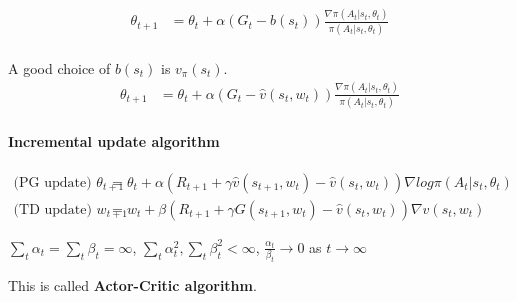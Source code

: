 \documentclass{article}
\begin{document}
\begin{align*}
  \theta_{t+1} &= \theta_t + \alpha (G_t - b(s_t))\frac{\nabla \pi(A_t|s_t, \theta_t)}{\pi(A_t|s_t, \theta_t)} \\
\end{align*}

A good choice of $b(s_t)$ is $v_{\pi}(s_t)$.
\begin{align*}
  \theta_{t+1} &= \theta_t + \alpha (G_t - \hat{v}(s_t, w_t))\frac{\nabla \pi(A_t|s_t, \theta_t)}{\pi(A_t|s_t, \theta_t)}
\end{align*}

\paragraph{Incremental update algorithm}
\begin{align*}
 \text{(PG update)  } \theta_{t+1} &= \theta_t + \alpha \left( R_{t+1} + \gamma \hat{v}(s_{t+1}, w_t) - \hat{v}(s_t, w_t) \right) \nabla log \pi(A_t|s_t, \theta_t) \\
  \text{(TD update) } w_{t+1} &= w_t + \beta\left(R_{t+1} + \gamma G(s_{t+1}, w_t) - \hat{v}(s_t, w_t)\right) \nabla \hat{v}(s_t, w_t)
\end{align*}

$\sum_t\alpha_t = \sum_t\beta_t = \infty$, $\sum_t\alpha_t^2, \sum_t\beta_t^2 < \infty$, $\frac{\alpha_t}{\beta_t}\rightarrow 0$ as $t \rightarrow \infty$

This is called \textbf{Actor-Critic algorithm}.
\end{document}
